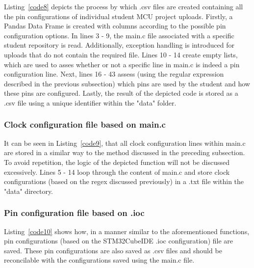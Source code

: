Listing~\ref{code8} depicts the process by which .csv files are created containing all the pin configurations of individual student MCU project uploads. Firstly, a Pandas Data Frame is created with columns according to the possible pin configuration options. In lines 3 - 9, the main.c file associated with a specific student repository is read. Additionally, exception handling is introduced for uploads that do not contain the required file. Lines 10 - 14 create empty lists, which are used to asses whether or not a specific line in main.c is indeed a pin configuration line. Next, lines 16 - 43 assess (using the regular expression described in the previous subsection) which pins are used by the student and how these pins are configured. Lastly, the result of the depicted code is stored as a .csv file using a unique identifier within the "data" folder.
\\
\subsubsection{Clock configuration file based on main.c}
\label{cloConMain.c}


It can be seen in Listing~\ref{code9}, that all clock configuration lines within main.c are stored in a similar way to the method discussed in the preceding subsection. To avoid repetition, the logic of the depicted function will not be discussed excessively. Lines 5 - 14 loop through the content of main.c and store clock configurations (based on the regex discussed previously) in a .txt file within the "data" directory.
\\
\subsubsection{Pin configuration file based on .ioc}
\label{cloConMain.c}


Listing~\ref{code10} shows how, in a manner similar to the aforementioned functions, pin configurations (based on the STM32CubeIDE .ioc configuration) file are saved. These pin configurations are also saved as .csv files and should be reconcilable with the configurations saved using the main.c file.
\\
